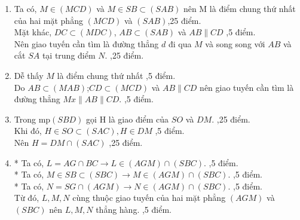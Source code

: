 \begin {ex}
{\begin{center}
\begin{tikzpicture}
			\end{tikzpicture}	
		\end{center}
		\begin{enumerate}
			\item Ta có, $ M \in (MCD) $ và $ M \in SB \subset (SAB) $  nên M là điểm chung thứ nhất của hai mặt phẳng $ (MCD) $ và $ (SAB) $,25 điểm. \\
			Mặt khác, $ DC \subset (MDC) $, $ AB \subset (SAB) $ và $ AB \parallel CD $  ,5 điểm. \\
			Nên giao tuyến cần tìm là đường thẳng $ d $ đi qua $ M $ và song song với $ AB $ và cắt $ SA $ tại trung điểm $ N $. ,25 điểm.
			\item Dễ thấy $ M $ là điểm chung thứ nhất ,5 điểm.\\
			Do $ AB \subset (MAB)$;$CD \subset (MCD)  $ và $AB \parallel CD  $ nên giao tuyến cần tìm là đường thẳng $ Mx \parallel AB \parallel CD $. ,5 điểm.
			\item 
			Trong mp$ (SBD) $ gọi H là giao điểm của $ SO $ và $ DM $. ,25 điểm. \\
			Khi đó, $ H \in SO \subset (SAC), H \in DM $ ,5 điểm. \\
			Nên $ H = DM \cap (SAC) $ ,25 điểm.
			
			\item * Ta có, $ L = AG \cap BC \rightarrow L \in (AGM) \cap (SBC)$. ,5 điểm. \\
			* Ta có, $ M \in SB \subset (SBC) \rightarrow M \in (AGM) \cap (SBC)$. ,5 điểm. \\
			* Ta có, $ N = SG \cap (AGM) \rightarrow N \in (AGM) \cap (SBC)$. ,5 điểm. \\
			Từ đó, $ L, M, N $ cùng thuộc giao tuyến của hai mặt phẳng $ (AGM) $ và $ (SBC) $ nên $ L, M, N $ thẳng hàng. ,5 điểm.
			
		\end{enumerate}	
	}
\end{ex}

